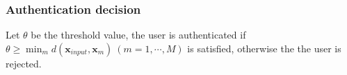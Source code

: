 \documentclass[sigchi,authordraft]{acmart}
\begin{document}



\subsubsection{Authentication decision}
Let $\theta$ be the threshold value, the user is authenticated if $  \theta \geq \min_md(\bm{x}_{input},\bm{x}_m)~(m=1,\cdots,M)
$ is satisfied, otherwise the the user is rejected.%

\end{document}
